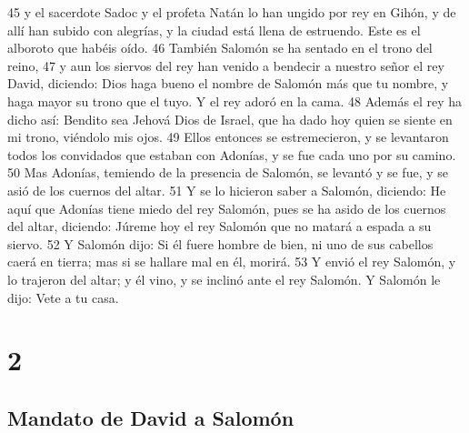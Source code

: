 45 y el sacerdote Sadoc y el profeta Natán lo han ungido por rey en Gihón, y de allí han subido con alegrías, y la ciudad está llena de estruendo. Este es el alboroto que habéis oído.
46 También Salomón se ha sentado en el trono del reino,
47 y aun los siervos del rey han venido a bendecir a nuestro señor el rey David, diciendo: Dios haga bueno el nombre de Salomón más que tu nombre, y haga mayor su trono que el tuyo. Y el rey adoró en la cama.
48 Además el rey ha dicho así: Bendito sea Jehová Dios de Israel, que ha dado hoy quien se siente en mi trono, viéndolo mis ojos.
49 Ellos entonces se estremecieron, y se levantaron todos los convidados que estaban con Adonías, y se fue cada uno por su camino.
50 Mas Adonías, temiendo de la presencia de Salomón, se levantó y se fue, y se asió de los cuernos del altar.
51 Y se lo hicieron saber a Salomón, diciendo: He aquí que Adonías tiene miedo del rey Salomón, pues se ha asido de los cuernos del altar, diciendo: Júreme hoy el rey Salomón que no matará a espada a su siervo.
52 Y Salomón dijo: Si él fuere hombre de bien, ni uno de sus cabellos caerá en tierra; mas si se hallare mal en él, morirá.
53 Y envió el rey Salomón, y lo trajeron del altar; y él vino, y se inclinó ante el rey Salomón. Y Salomón le dijo: Vete a tu casa.

\chapter{2}

\section*{Mandato de David a Salomón}


